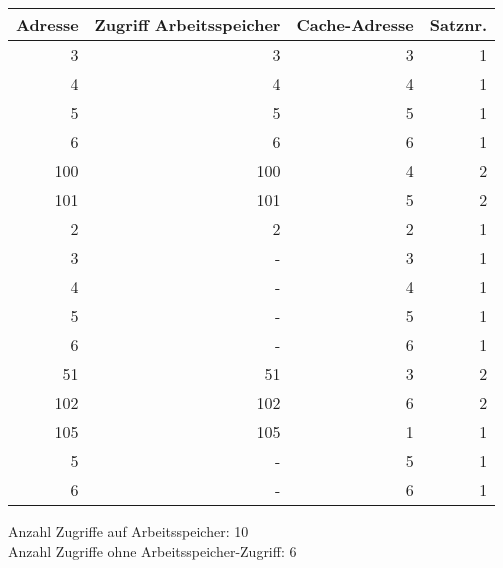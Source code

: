 \documentclass[10pt]{article}
\begin{document}
\begin{enumerate}[label=\alph*)]
		\begin{tabular}{r | r | r | r}
		Adresse & Zugriff Arbeitsspeicher & Cache-Adresse & Satznr.\\
		\hline
		3	& 	3 	& 3 	& 1\\
		4	&	4 	& 4 	& 1\\
		5	&	5 	& 5 	& 1\\
		6	&	6 	& 6 	& 1\\
		100	&	100 & 4 	& 2\\
		101	&	101	& 5 	& 2\\
		2	&	2	& 2 	& 1\\
		3	&	-	& 3 	& 1\\
		4	&	-	& 4 	& 1\\ %
		5	&	-	& 5 	& 1\\
		6	&	-	& 6 	& 1\\
		51	&	51	& 3 	& 2\\
		102 &	102 & 6 	& 2\\
		105 &	105 & 1		& 1\\  %
		5	&	-	& 5 	& 1\\
		6	&	-	& 6 	& 1\\
		\end{tabular}
		
		Anzahl Zugriffe auf Arbeitsspeicher: 10 \\
		Anzahl Zugriffe ohne Arbeitsspeicher-Zugriff: 6
\end{enumerate}

\newpage
\end{document}
